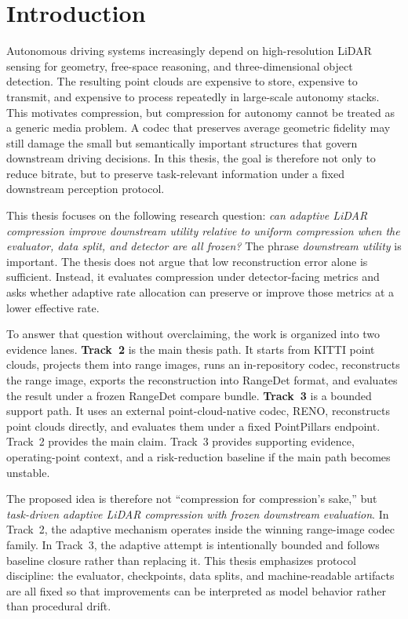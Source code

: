 \section{Introduction}\label{sec:introduction}
Autonomous driving systems increasingly depend on high-resolution LiDAR sensing for geometry, free-space reasoning, and three-dimensional object detection. The resulting point clouds are expensive to store, expensive to transmit, and expensive to process repeatedly in large-scale autonomy stacks. This motivates compression, but compression for autonomy cannot be treated as a generic media problem. A codec that preserves average geometric fidelity may still damage the small but semantically important structures that govern downstream driving decisions. In this thesis, the goal is therefore not only to reduce bitrate, but to preserve task-relevant information under a fixed downstream perception protocol.

This thesis focuses on the following research question: \emph{can adaptive LiDAR compression improve downstream utility relative to uniform compression when the evaluator, data split, and detector are all frozen?} The phrase \emph{downstream utility} is important. The thesis does not argue that low reconstruction error alone is sufficient. Instead, it evaluates compression under detector-facing metrics and asks whether adaptive rate allocation can preserve or improve those metrics at a lower effective rate.

To answer that question without overclaiming, the work is organized into two evidence lanes. \textbf{Track~2} is the main thesis path. It starts from KITTI point clouds, projects them into range images, runs an in-repository codec, reconstructs the range image, exports the reconstruction into RangeDet format, and evaluates the result under a frozen RangeDet compare bundle. \textbf{Track~3} is a bounded support path. It uses an external point-cloud-native codec, RENO, reconstructs point clouds directly, and evaluates them under a fixed PointPillars endpoint. Track~2 provides the main claim. Track~3 provides supporting evidence, operating-point context, and a risk-reduction baseline if the main path becomes unstable.

The proposed idea is therefore not ``compression for compression's sake,'' but \emph{task-driven adaptive LiDAR compression with frozen downstream evaluation}. In Track~2, the adaptive mechanism operates inside the winning range-image codec family. In Track~3, the adaptive attempt is intentionally bounded and follows baseline closure rather than replacing it. This thesis emphasizes protocol discipline: the evaluator, checkpoints, data splits, and machine-readable artifacts are all fixed so that improvements can be interpreted as model behavior rather than procedural drift.

